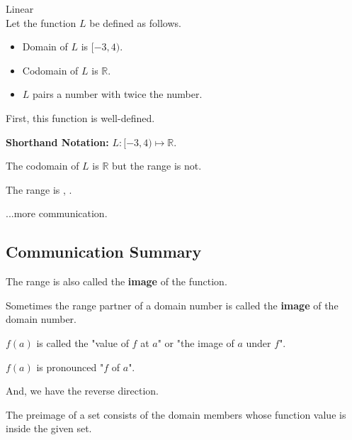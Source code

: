\documentclass{ximera}
\begin{document}
\begin{example} Linear \\

Let the function $L$ be defined as follows.


\begin{itemize}
\item Domain of $L$ is $[-3, 4)$.
\item Codomain of $L$ is $\mathbb{R}$.
\item $L$ pairs a number with twice the number.
\end{itemize}


First, this function is well-defined. 


\textbf{Shorthand Notation: } $L: [-3, 4) \mapsto \mathbb{R}$.

\begin{question}

The codomain of $L$ is $\mathbb{R}$ but the range is not.  

The range is \wordChoice{\choice[correct]{[}\choice{(}}  ,  \wordChoice{\choice{]}\choice[correct]{)}}.

\end{question}



\end{example}
...more communication. \\






\subsection{Communication Summary}







The range is also called the \textbf{image} of the function.   

Sometimes the range partner of a domain number is called the \textbf{image} of the domain number.

$f(a)$ is called the "value of $f$ at $a$" or "the image of $a$ under $f$".


$f(a)$ is pronounced "$f$ of $a$".


And, we have the reverse direction.

The preimage of a set consists of the domain members whose function value is inside the given set.
\end{document}
